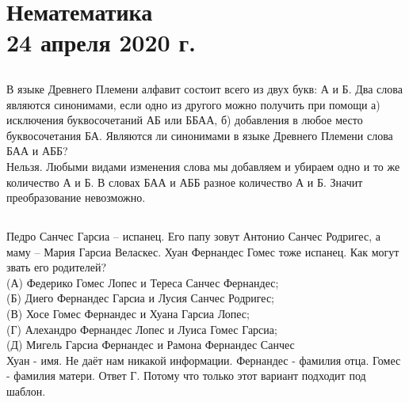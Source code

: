 \documentclass[a4paper,12pt]{article} %
\begin{document}
	\newpage
	\section{Нематематика \\24 апреля 2020 г.}
	
	\subsection{}{В языке Древнего Племени алфавит состоит всего из двух букв: А и Б. Два слова являются синонимами, если одно из другого можно получить при помощи а) исключения буквосочетаний АБ или ББАА, б) добавления в любое место буквосочетания БА. Являются ли синонимами в языке Древнего Племени слова БАА и АББ?\\
		
		Нельзя. Любыми видами изменения слова мы добавляем и убираем одно и то же количество А и Б. В словах БАА и АББ разное количество А и Б. Значит преобразование невозможно.
	}
	
	\subsection{}{Педро Санчес Гарсиа – испанец. Его папу зовут Антонио Санчес Родригес, а маму – Мария Гарсиа Веласкес. Хуан Фернандес Гомес тоже испанец. Как могут звать его родителей?\\
		(А) Федерико Гомес Лопес и Тереса Санчес Фернандес;\\
		(Б) Диего Фернандес Гарсиа и Лусия Санчес Родригес;\\
		(В) Хосе Гомес Фернандес и Хуана Гарсиа Лопес;\\
		(Г) Алехандро Фернандес Лопес и Луиса Гомес Гарсиа;\\
		(Д) Мигель Гарсиа Фернандес и Рамона Фернандес Санчес\\
		
		Хуан - имя. Не даёт нам никакой информации. Фернандес - фамилия отца. Гомес - фамилия матери. Ответ Г. Потому что только этот вариант подходит под шаблон. 
	}
	
\end{document}
